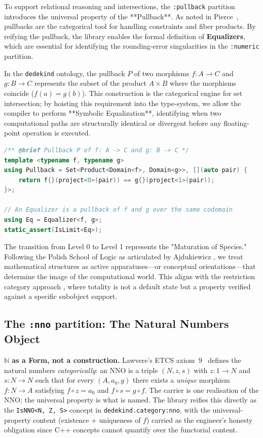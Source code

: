 \documentclass[11pt, a4paper]{report}
\begin{document}
To support relational reasoning and intersections, the \texttt{:pullback} partition introduces the universal property of the **Pullback**. As noted in Pierce~\cite{pierce1991basic}, pullbacks are the categorical tool for handling constraints and fiber products. By reifying the pullback, the library enables the formal definition of \textbf{Equalizers}, which are essential for identifying the rounding-error singularities in the \texttt{:numeric} partition.

In the \texttt{dedekind} ontology, the pullback $P$ of two morphisms $f: A \to C$ and $g: B \to C$ represents the subset of the product $A \times B$ where the morphisms coincide ($f(a) = g(b)$). This construction is the categorical engine for set intersection; by hoisting this requirement into the type-system, we allow the compiler to perform **Symbolic Equalization**, identifying when two computational paths are structurally identical or divergent before any floating-point operation is executed.

\begin{lstlisting}[language=C++, caption={Pullbacks and Equalizers: The Engine of Constraint.}, label={lst:pullback_logic}]
/** @brief Pullback P of f: A -> C and g: B -> C */
template <typename f, typename g>
using Pullback = Set<Product<Domain<f>, Domain<g>>, [](auto pair) {
    return f{}(project<0>(pair)) == g{}(project<1>(pair));
}>;

// An Equalizer is a pullback of f and g over the same codomain
using Eq = Equalizer<f, g>; 
static_assert(IsLimit<Eq>);
\end{lstlisting}

The transition from Level 0 to Level 1 represents the "Maturation of Species." Following the Polish School of Logic as articulated by Ajdukiewicz \cite{ajdukiewicz1985jezyk}, we treat mathematical structures as active apparatuses—or conceptual orientations—that determine the image of the computational world. This aligns with the restriction category approach \cite{cockett2002restriction}, where totality is not a default state but a property verified against a specific subobject support.

\subsection{The \texttt{:nno} partition: The Natural Numbers Object}
\label{subsec:nno-partition}

\textbf{$\mathbb{N}$ as a Form, not a construction.} Lawvere's ETCS axiom~9~\cite{lawvere1964elementary} defines the natural numbers \emph{categorically}: an NNO is a triple $(N, z, s)$ with $z : 1 \to N$ and $s : N \to N$ such that for every $(A, a_0, g)$ there exists a \emph{unique} morphism $f : N \to A$ satisfying $f \circ z = a_0$ and $f \circ s = g \circ f$. The carrier is one realisation of the NNO; the universal property is what is named. The library reifies this directly as the \texttt{IsNNO<N, Z, S>} concept in \texttt{dedekind.category:nno}, with the universal-property content (existence + uniqueness of $f$) carried as the engineer's honesty obligation since C++ concepts cannot quantify over the functorial content.
\end{document}
